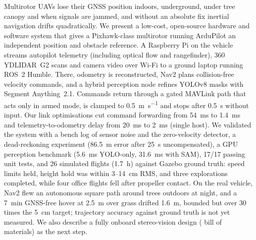 Multirotor UAVs lose their GNSS position indoors, underground, under tree canopy and
when signals are jammed, and without an absolute fix inertial navigation drifts
quadratically. We present a low-cost, open-source hardware and software system that
gives a Pixhawk-class multirotor running ArduPilot an independent position and obstacle
reference. A Raspberry Pi on the vehicle streams autopilot telemetry (including optical
flow and rangefinder), 360\textdegree{} YDLIDAR~G2 scans and camera video over Wi-Fi
to a ground laptop running ROS~2 Humble. There, odometry is reconstructed, Nav2 plans
collision-free velocity commands, and a hybrid perception node refines YOLOv8 masks
with Segment Anything~2.1. Commands return through a gated MAVLink path that acts only
in armed  mode, is clamped to \SI{0.5}{\metre\per\second} and stops after
\SI{0.5}{\second} without input. Our link optimisations cut command forwarding from
\SI{54}{\milli\second} to \SI{1.4}{\milli\second} and telemetry-to-odometry delay from
\SI{20}{\milli\second} to \SI{2}{\milli\second} (single host). We validated the system with a
bench log of sensor noise and the zero-velocity detector, a dead-reckoning
experiment (\SI{86.5}{\metre} error after \SI{25}{\second} uncompensated), a GPU
perception benchmark (\SI{5.6}{\milli\second} YOLO-only, \SI{31.6}{\milli\second} with
SAM), 17/17 passing unit tests, and 26 simulated flights (\SI{1.7}{h}) against Gazebo ground truth: speed
limits held, height hold was within 3--\SI{14}{cm} RMS, and three explorations
completed, while four office flights fell after propeller contact. On the real vehicle,
Nav2 flew an autonomous square path around trees outdoors at night, and a
\SI{7}{\minute} GNSS-free hover at \SI{2.5}{\metre} over grass drifted \SI{1.6}{\metre}, bounded but over 30 times the
\SI{5}{\centi\metre} target; trajectory accuracy against ground truth is not yet
measured. We also describe a fully onboard stereo-vision design
( bill of materials) as the next step.
